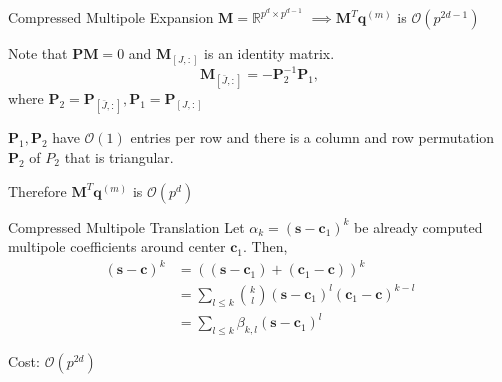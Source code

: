 \documentclass[10pt]{beamer}
\def\b#1{\mathbf{ #1}}
\begin{document}
\begin{frame}[fragile]{Compressed Multipole Expansion}
 $\b M = \mathbb{R}^{p^d \times p^{d-1}}$
 $\implies \b M^T \b q^{(m)} $ is $\mathcal{O}(p^{2d-1})$
 
 Note that $\b P \b M = 0$ and $\b M_{[J, :]}$ is an identity matrix.
 \[
  \b M_{[\bar{J}, :]} = - \b P_2^{-1} \b P_1,
 \]where $\b P_2 = \b P_{[\bar{J}, :]}, \b P_1 = \b P_{[J, :]}$

 $\b P_1, \b P_2$ have $\mathcal{O}(1)$ entries per row and there is a column and row permutation $\b P_2$ of $P_2$ that is triangular.

 Therefore $ \b M^T \b q^{(m)} $ is $\mathcal{O}(p^{d})$
 
\end{frame}





\begin{frame}[fragile]{Compressed Multipole Translation}
Let $\alpha_k = (\b s-\b c_1)^k $ be already computed multipole coefficients around center $\b c_1$. Then,
\begin{align*}
(\b s-\b c)^k &= \left(\left(\b s-\b c_1\right) + \left(\b c_1-\b c\right)\right)^k   \\
&= \sum_{l \le k} \binom{k}{l}\left(\b s-\b c_1\right)^l \left(\b c_1-\b c\right)^{k-l} \\
&= \sum_{l \le k} \beta_{k, l}\left(\b s-\b c_1\right)^l
\end{align*}

Cost: $\mathcal{O}(p^{2d})$
\end{frame}
\end{document}

